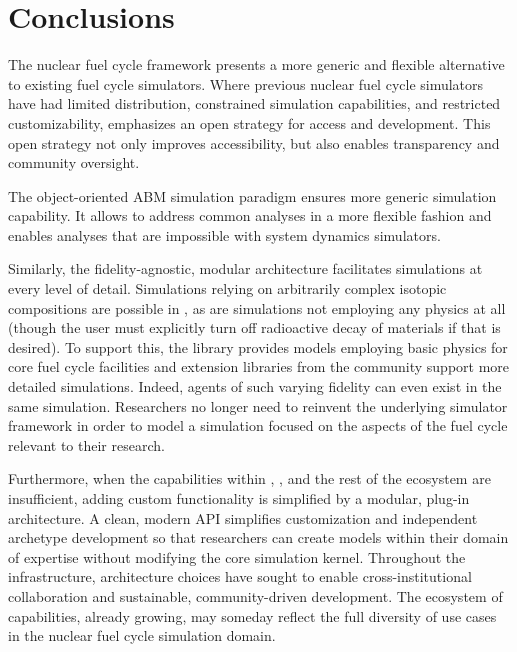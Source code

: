 

\section{Conclusions}


The \Cyclus nuclear fuel cycle framework presents a more generic and flexible
alternative to existing fuel cycle simulators. Where previous nuclear fuel
cycle simulators have had limited distribution, constrained simulation
capabilities, and restricted customizability, \Cyclus emphasizes an open
strategy for access and development.  This open strategy not only improves
accessibility, but also enables transparency and community oversight.

The object-oriented \gls{ABM} simulation paradigm ensures more generic
simulation capability. It allows \Cyclus to address common analyses in a more
flexible fashion and enables analyses that are impossible with system dynamics
simulators.

Similarly, the fidelity-agnostic, modular \Cyclus architecture facilitates simulations
at every level of detail. Simulations relying on arbitrarily complex isotopic
compositions are possible in \Cyclus, as are simulations not employing any
physics at all (though the user must explicitly turn off radioactive decay of 
materials if that is desired). To support this, the \Cycamore library provides models 
employing basic physics for core fuel cycle facilities and extension libraries 
from the community support more detailed simulations. Indeed, agents of such 
varying fidelity can even exist in the same simulation. Researchers no longer 
need to reinvent the underlying simulator framework in order to model a simulation 
focused on the aspects of the fuel cycle relevant to their research.

Furthermore, when the capabilities within \Cyclus, \Cycamore, and the rest of
the ecosystem are insufficient, adding custom functionality is simplified by a
modular, plug-in architecture. A clean, modern \gls{API} simplifies
customization and independent archetype development so that researchers can
create models within their domain of expertise without modifying the core
simulation kernel. Throughout the \Cyclus
infrastructure, architecture choices have sought to enable cross-institutional
collaboration and sustainable, community-driven development. The ecosystem
of capabilities, already growing, may someday reflect the full diversity of use
cases in the nuclear fuel cycle simulation domain.


